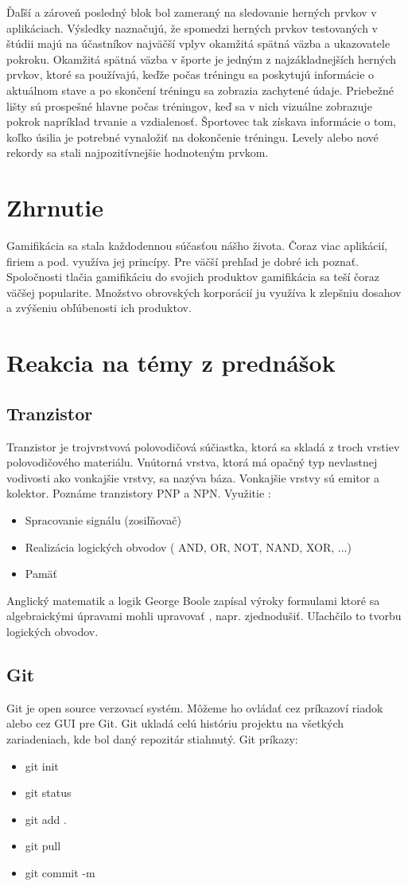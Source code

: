 \documentclass[10pt,twoside,slovak,a4paper]{article}
\begin{document}
Ďaľší a zároveň posledný blok bol zameraný na sledovanie herných prvkov v aplikáciach. Výsledky naznačujú, že spomedzi herných prvkov testovaných v štúdii majú na účastníkov najväčší vplyv okamžitá spätná väzba a ukazovatele pokroku.
Okamžitá spätná väzba v športe je jedným z najzákladnejších herných prvkov, ktoré sa používajú, keďže počas tréningu sa poskytujú informácie o aktuálnom stave a po skončení tréningu sa zobrazia zachytené údaje. Priebežné lišty sú prospešné hlavne počas tréningov, keď sa v nich vizuálne zobrazuje pokrok napríklad trvanie a vzdialenosť. Športovec tak získava informácie o tom, koľko úsilia je potrebné vynaložiť na dokončenie tréningu. 
Levely alebo nové rekordy sa stali najpozitívnejšie hodnoteným prvkom.
\section{Zhrnutie}
Gamifikácia sa stala každodennou súčasťou nášho života. Čoraz viac aplikácií, firiem a pod. využíva jej princípy. Pre väčší prehľad je dobré ich poznať. Spoločnosti tlačia gamifikáciu do svojich produktov gamifikácia sa teší čoraz väčšej popularite. Množstvo obrovských korporácií ju využíva k zlepšniu dosahov a zvýšeniu obľúbenosti ich produktov. 
\section{Reakcia na témy z prednášok}
\subsection{Tranzistor}
Tranzistor je trojvrstvová polovodičová súčiastka, ktorá sa skladá z troch vrstiev polovodičového materiálu. \cite{Tranzistory-Framework} Vnútorná vrstva, ktorá má opačný typ nevlastnej vodivosti ako vonkajšie vrstvy, sa nazýva báza. Vonkajšie vrstvy sú emitor a kolektor. Poznáme tranzistory PNP a NPN. 
\hfill
\break
Využitie : 
\begin{itemize}
  \item {Spracovanie signálu (zosiľňovač)}
  \item {Realizácia logických obvodov ( AND, OR, NOT, NAND, XOR, ...)}
  \item {Pamäť}
\end{itemize}
Anglický matematik a logik George Boole zapísal výroky formulami ktoré sa algebraickými úpravami mohli upravovať , napr. zjednodušiť. Uľachčilo to tvorbu logických obvodov.\cite{Tranzistory2-Framework}
\subsection{Git}
Git je open source verzovací systém. Môžeme ho ovládať cez príkazoví riadok alebo cez GUI pre Git. \cite{Git-Framework} Git ukladá celú históriu projektu na všetkých zariadeniach, kde bol daný repozitár stiahnutý.
Git príkazy: 
\begin{itemize}
  \item {git init}
  \item {git status}
  \item {git add .}
  \item {git pull}
  \item {git commit -m}
\end{itemize}
\newpage
\end{document}

